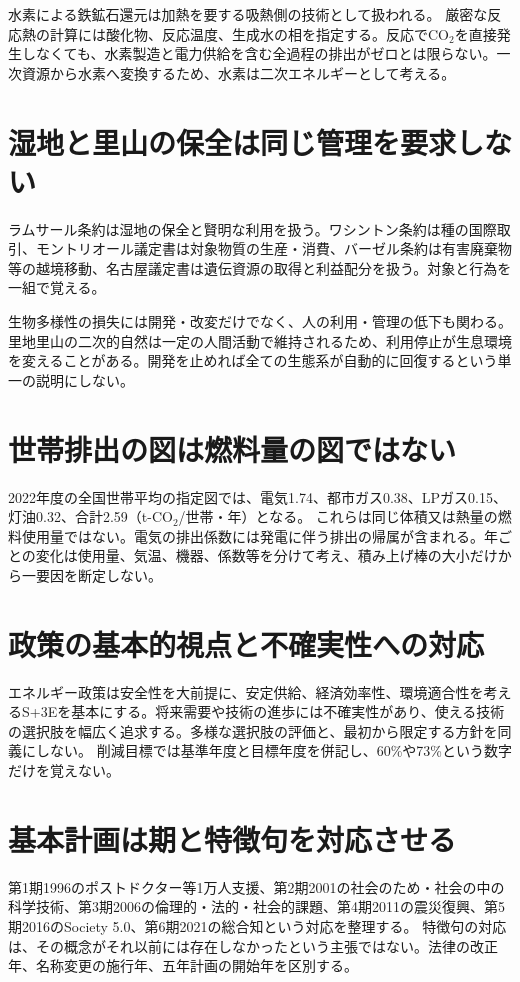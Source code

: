 水素による鉄鉱石還元は加熱を要する吸熱側の技術として扱われる。\cite{env60_hydrogen}
厳密な反応熱の計算には酸化物、反応温度、生成水の相を指定する。反応でCO\(_2\)を直接発生しなくても、水素製造と電力供給を含む全過程の排出がゼロとは限らない。一次資源から水素へ変換するため、水素は二次エネルギーとして考える。

\section{湿地と里山の保全は同じ管理を要求しない}
\label{theory:env:biodiversity2023}
\label{theory:env:treaties}
ラムサール条約は湿地の保全と賢明な利用を扱う。ワシントン条約は種の国際取引、モントリオール議定書は対象物質の生産・消費、バーゼル条約は有害廃棄物等の越境移動、名古屋議定書は遺伝資源の取得と利益配分を扱う。対象と行為を一組で覚える。\cite{env60_ramsar}

生物多様性の損失には開発・改変だけでなく、人の利用・管理の低下も関わる。里地里山の二次的自然は一定の人間活動で維持されるため、利用停止が生息環境を変えることがある。開発を止めれば全ての生態系が自動的に回復するという単一の説明にしない。\cite{env60_biodiversity}

\section{世帯排出の図は燃料量の図ではない}
\label{theory:env:house2022}
2022年度の全国世帯平均の指定図では、電気1.74、都市ガス0.38、LPガス0.15、灯油0.32、合計2.59（t-CO\(_2\)/世帯・年）となる。\cite{env60_house2022}
これらは同じ体積又は熱量の燃料使用量ではない。電気の排出係数には発電に伴う排出の帰属が含まれる。年ごとの変化は使用量、気温、機器、係数等を分けて考え、積み上げ棒の大小だけから一要因を断定しない。

\section{政策の基本的視点と不確実性への対応}
\label{theory:env:energyplan7}
エネルギー政策は安全性を大前提に、安定供給、経済効率性、環境適合性を考えるS+3Eを基本にする。将来需要や技術の進歩には不確実性があり、使える技術の選択肢を幅広く追求する。多様な選択肢の評価と、最初から限定する方針を同義にしない。\cite{env60_plan7}
削減目標では基準年度と目標年度を併記し、60\%や73\%という数字だけを覚えない。

\section{基本計画は期と特徴句を対応させる}
\label{theory:env:scienceplans}
第1期1996のポストドクター等1万人支援、第2期2001の社会のため・社会の中の科学技術、第3期2006の倫理的・法的・社会的課題、第4期2011の震災復興、第5期2016のSociety 5.0、第6期2021の総合知という対応を整理する。\cite{env60_plan2,env60_plan3}
特徴句の対応は、その概念がそれ以前には存在しなかったという主張ではない。法律の改正年、名称変更の施行年、五年計画の開始年を区別する。

